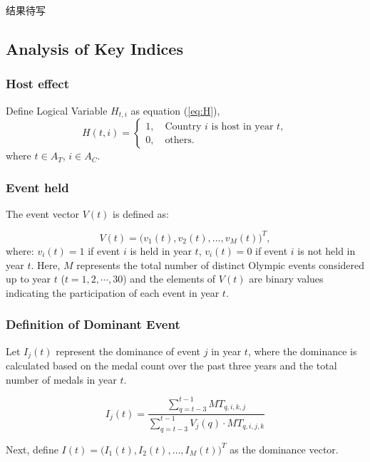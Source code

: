 \documentclass{mcmthesis}
\begin{document}
	结果待写
	
	
	
	\subsection{Analysis of Key Indices}
	\subsubsection{Host effect}
	
	Define Logical Variable $H_{t,i}$ as equation (\ref{eq:H}),
	\begin{equation}
		H(t,i)=
		\begin{cases}
			1, \quad \text{Country } i \text{ is host in year } t, \\
			0, \quad \text{others}.
		\end{cases}
		\label{eq:H}
	\end{equation}
	where $t\in A_{T}$, $i\in A_{C}$.
	
	
	
	\subsubsection{Event held}
	The event vector \( V(t) \) is defined as:
	
	\[
	V(t) = \big( v_1(t), v_2(t), \dots, v_M(t) \big)^T,
	\]
	where: \( v_i(t) = 1 \) if event \( i \) is held in year \( t \),
	\( v_i(t) = 0 \) if event \( i \) is not held in year \( t \). Here, \( M \) represents the total number of distinct Olympic events considered up to year \( t \) ($t=1,2,\cdots,30$) and the elements of \( V(t) \) are binary values indicating the participation of each event in year \( t \).
	
	
	
	\subsubsection{Definition of Dominant Event}
	
	Let \( I_j(t) \) represent the dominance of event \( j \) in year \( t \), where the dominance is calculated based on the medal count over the past three years and the total number of medals in year \( t \).
	
	\[
	I_j(t) = \frac{\sum_{q=t-3}^{t-1} MT_{q,i,k,j}}{\sum_{q=t-3}^{t-1} V_j(q) \cdot MT_{q,i,j,k}} 
	\]
	
	Next, define \( I(t) = \big( I_1(t), I_2(t), \dots, I_M(t) \big)^T \) as the dominance vector. 
	
\end{document}
